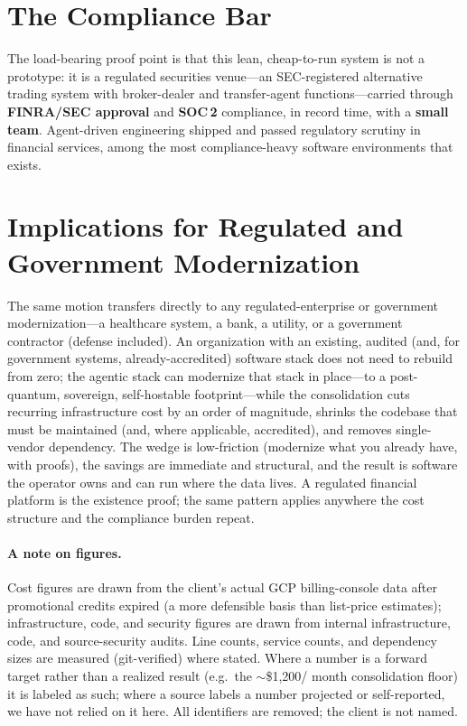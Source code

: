 \documentclass[11pt,letterpaper]{article}
\begin{document}
\section{The Compliance Bar}

The load-bearing proof point is that this lean, cheap-to-run system is not a
prototype: it is a regulated securities venue---an SEC-registered alternative
trading system with broker-dealer and transfer-agent functions---carried through
\textbf{FINRA/SEC approval} and \textbf{SOC\,2} compliance, in record time, with a
\textbf{small team}. Agent-driven engineering shipped and passed regulatory scrutiny
in financial services, among the most compliance-heavy software environments that
exists.

\section{Implications for Regulated and Government Modernization}

The same motion transfers directly to any regulated-enterprise or government
modernization---a healthcare system, a bank, a utility, or a government
contractor (defense included). An organization with an existing, audited (and,
for government systems, already-accredited) software stack does not need to
rebuild from zero; the agentic stack can modernize that stack in place---to a
post-quantum, sovereign, self-hostable footprint---while the consolidation cuts
recurring infrastructure cost by an order of magnitude, shrinks the codebase that
must be maintained (and, where applicable, accredited), and removes single-vendor
dependency. The wedge
is low-friction (modernize what you already have, with proofs), the savings are
immediate and structural, and the result is software the operator owns and can run
where the data lives. A regulated financial platform is the existence proof; the
same pattern applies anywhere the cost structure and the compliance burden repeat.

\paragraph{A note on figures.} Cost figures are drawn from the client's actual GCP
billing-console data after promotional credits expired (a more defensible basis than
list-price estimates); infrastructure, code, and security figures are drawn from
internal infrastructure, code, and source-security audits. Line counts, service
counts, and dependency sizes are measured (git-verified) where stated. Where a
number is a forward target rather than a realized result (e.g.\ the $\sim$\$1{,}200/
month consolidation floor) it is labeled as such; where a source labels a number
projected or self-reported, we have not relied on it here. All identifiers are
removed; the client is not named.
\end{document}
